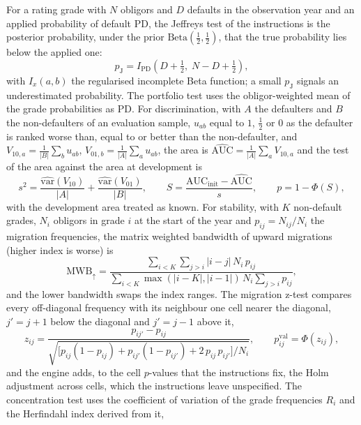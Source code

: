 For a rating grade with $N$ obligors and $D$ defaults in the observation year and an applied probability of default $\mathrm{PD}$, the Jeffreys test of the instructions is the posterior probability, under the prior $\mathrm{Beta}(\tfrac12,\tfrac12)$, that the true probability lies below the applied one:
\begin{equation}
  p_{\mathrm{J}}=I_{\mathrm{PD}}\!\left(D+\tfrac12,\;N-D+\tfrac12\right),
  \label{eq:jeffreys}
\end{equation}
with $I_x(a,b)$ the regularised incomplete Beta function; a small $p_{\mathrm{J}}$ signals an underestimated probability. The portfolio test uses the obligor-weighted mean of the grade probabilities as $\mathrm{PD}$. For discrimination, with $A$ the defaulters and $B$ the non-defaulters of an evaluation sample, $u_{ab}$ equal to $1$, $\tfrac12$ or $0$ as the defaulter is ranked worse than, equal to or better than the non-defaulter, and $V_{10,a}=\frac1{|B|}\sum_b u_{ab}$, $V_{01,b}=\frac1{|A|}\sum_a u_{ab}$, the area is $\widehat{\mathrm{AUC}}=\frac1{|A|}\sum_a V_{10,a}$ and the test of the area against the area at development is
\begin{equation}
  s^2=\frac{\widehat{\mathrm{var}}(V_{10})}{|A|}+\frac{\widehat{\mathrm{var}}(V_{01})}{|B|},\qquad
  S=\frac{\mathrm{AUC}_{\mathrm{init}}-\widehat{\mathrm{AUC}}}{s},\qquad
  p=1-\Phi(S),
  \label{eq:auc}
\end{equation}
with the development area treated as known. For stability, with $K$ non-default grades, $N_i$ obligors in grade $i$ at the start of the year and $p_{ij}=N_{ij}/N_i$ the migration frequencies, the matrix weighted bandwidth of upward migrations (higher index is worse) is
\begin{equation}
  \mathrm{MWB}_{\uparrow}=\frac{\sum_{i<K}\sum_{j>i}|i-j|\,N_i\,p_{ij}}{\sum_{i<K}\max(|i-K|,|i-1|)\,N_i\sum_{j>i}p_{ij}},
  \label{eq:mwb}
\end{equation}
and the lower bandwidth swaps the index ranges. The migration z-test compares every off-diagonal frequency with its neighbour one cell nearer the diagonal, $j'=j+1$ below the diagonal and $j'=j-1$ above it,
\begin{equation}
  z_{ij}=\frac{p_{ij'}-p_{ij}}{\sqrt{\bigl[p_{ij}(1-p_{ij})+p_{ij'}(1-p_{ij'})+2\,p_{ij}\,p_{ij'}\bigr]/N_i}},\qquad p_{ij}^{\mathrm{val}}=\Phi(z_{ij}),
  \label{eq:migration}
\end{equation}
and the engine adds, to the cell $p$-values that the instructions fix, the Holm adjustment across cells, which the instructions leave unspecified. The concentration test uses the coefficient of variation of the grade frequencies $R_i$ and the Herfindahl index derived from it,
